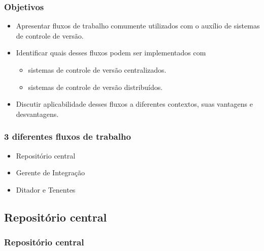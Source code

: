 \documentclass{beamer}
\begin{document}
\begin{frame}
  \frametitle{Objetivos}
  \begin{itemize}
    \item Apresentar fluxos de trabalho comumente utilizados com o
      auxílio de sistemas de controle de versão.
    \item Identificar quais desses fluxos podem ser implementados com
      \begin{itemize}
        \item sistemas de controle de versão centralizados.
        \item sistemas de controle de versão distribuídos.
      \end{itemize}
    \item Discutir aplicabilidade desses fluxos a diferentes contextos,
      suas vantagens e desvantagens.
  \end{itemize}
\end{frame}

\begin{frame}
  \frametitle{3 diferentes fluxos de trabalho}
  \begin{itemize}
    \item Repositório central
    \item Gerente de Integração
    \item Ditador e Tenentes
  \end{itemize}
\end{frame}

\subsection{Repositório central}

\begin{frame}
  \frametitle{Repositório central}
  \begin{figure}[h]
    \begin{center}
    \end{center}
    \label{fig:centralized-repository}
  \end{figure}
\end{frame}
\end{document}
